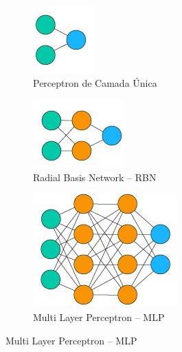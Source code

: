 \begin{figure}[!ht]
	\begin{subfigure}[h]{0.15\linewidth}
		\caption{Perceptron de Camada Única}
		\label{fig:slp}
		\centering
		\includegraphics[width=0.6\linewidth]{img/pop_arch/single_layer_perceptron.jpg}
	\end{subfigure}
	\hspace{0.1cm}
	\begin{subfigure}[h]{0.15\linewidth}
		\caption{Radial Basis Network -- RBN}
		\label{fig:rbm}
		\centering
		\includegraphics[width=0.9\linewidth]{img/pop_arch/radial_basis_network.jpg}
	\end{subfigure}
	\hspace{0.1cm}
	\begin{subfigure}[h]{0.3\linewidth}
		\caption{Multi Layer Perceptron -- MLP}
		\label{fig:mlp-pop}
		\centering
		\includegraphics[width=0.75\linewidth]{img/pop_arch/mlp.jpg}

\end{subfigure}
\end{figure}

